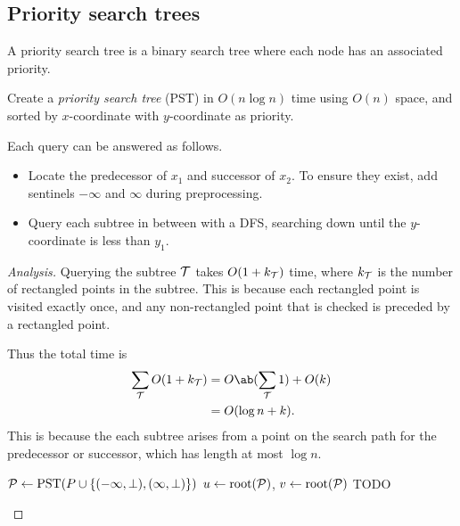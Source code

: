 \subsection{Priority search trees} \label{sec:ors:pst}
A priority search tree is a binary search tree where each node has an
associated priority.

\begin{solution}
    Create a \emph{priority search tree} (PST) in $O(n \log n)$ time
    using $O(n)$ space, and sorted by $x$-coordinate with $y$-coordinate
    as priority.

    Each query can be answered as follows.
    \begin{itemize}
        \item Locate the predecessor of $x_1$ and successor of $x_2$.
        To ensure they exist, add sentinels $-\infty$ and $\infty$ during
        preprocessing.
        \item Query each subtree in between with a DFS, searching down until
        the $y$-coordinate is less than $y_1$. \qedhere
    \end{itemize}
\end{solution}
\begin{proof}[Analysis]
    Querying the subtree $\mathcal{T}$ takes $O(1 + k_{\mathcal{T}})$ time, where
    $k_{\mathcal{T}}$ is the number of rectangled points in the subtree.
    This is because each rectangled point is visited exactly once,
    and any non-rectangled point that is checked is preceded by a
    rectangled point.

    Thus the total time is \begin{align*}
        \sum_\mcT O(1 + k_\mcT) &= O\ab(\sum_\mcT 1) + O(k) \\
        &= O(\log n + k).
    \end{align*}
    This is because the each subtree arises from a point on the search path
    for the predecessor or successor, which has length at most $\log n$.
    \begin{algo}
            \State $\mathcal{P} \gets \text{PST}(P \cup \{(-\infty, \bot), (\infty, \bot)\})$
            \State $u \gets \text{root}(\mathcal{P})$, $v \gets \text{root}(\mathcal{P})$
                \State TODO %
            \EndWhile
        \EndFn
    \end{algo}
\end{proof}


